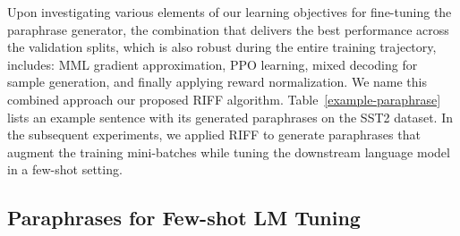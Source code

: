 \documentclass[11pt]{article}
\begin{document}
Upon investigating various elements of our learning objectives for fine-tuning the paraphrase generator, the combination that delivers the best performance across the validation splits, which is also robust during the entire training trajectory, includes: MML gradient approximation, PPO learning, mixed decoding for sample generation, and finally applying reward normalization. We name this combined approach our proposed RIFF algorithm. Table~\ref{example-paraphrase} lists an example sentence with its generated paraphrases on the SST2 dataset. In the subsequent experiments, we applied RIFF to generate paraphrases that augment the training mini-batches while tuning the downstream language model in a few-shot setting.

\subsection{Paraphrases for Few-shot LM Tuning}
\end{document}
